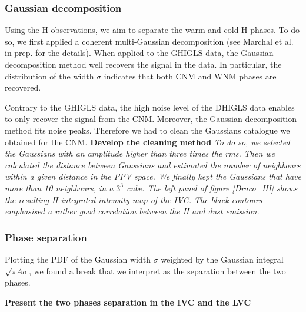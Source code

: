 \documentclass[traditabstract]{aa}
\begin{document}
      \subsubsection{Gaussian decomposition}

   Using the H observations, we aim to separate the warm and cold H phases. To do so, we first applied a coherent multi-Gaussian decomposition (see Marchal et al. in prep. for the details). When applied to the GHIGLS data, the Gaussian decomposition method well recovers the signal in the data. In particular, the distribution of the width $\sigma$ indicates that both CNM and WNM phases are recovered.

   Contrary to the GHIGLS data, the high noise level of the DHIGLS data enables to only recover the signal from the CNM. Moreover, the Gaussian decomposition method fits noise peaks. Therefore we had to clean the Gaussians catalogue we obtained for the CNM. \textbf{Develop the cleaning method}
\textit{To do so, we selected the Gaussians with an amplitude higher than three times the rms. Then we calculated the distance between Gaussians and estimated the number of neighbours within a given distance in the PPV space. We finally kept the Gaussians that have more than 10 neighbours, in a $3^3$ cube. The left panel of figure \ref{Draco_HI} shows the resulting H integrated intensity map of the IVC. The black contours emphasised a rather good correlation between the H and dust emission.}


      \subsubsection{Phase separation}

   Plotting the PDF of the Gaussian width $\sigma$ weighted by the Gaussian integral $\sqrt{\pi A\sigma}$, we found a break that we interpret as the separation between the two phases.


\textbf{Present the two phases separation in the IVC and the LVC}
\end{document}
